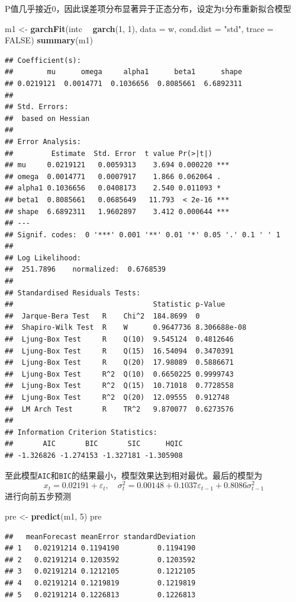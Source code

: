 \documentclass[
]{article}
\newenvironment{Shaded}{\begin{snugshade}}{\end{snugshade}}
\newcommand{\DataTypeTok}[1]{\textcolor[rgb]{0.13,0.29,0.53}{#1}}
\newcommand{\DecValTok}[1]{\textcolor[rgb]{0.00,0.00,0.81}{#1}}
\newcommand{\KeywordTok}[1]{\textcolor[rgb]{0.13,0.29,0.53}{\textbf{#1}}}
\newcommand{\NormalTok}[1]{#1}
\newcommand{\OperatorTok}[1]{\textcolor[rgb]{0.81,0.36,0.00}{\textbf{#1}}}
\newcommand{\OtherTok}[1]{\textcolor[rgb]{0.56,0.35,0.01}{#1}}
\newcommand{\StringTok}[1]{\textcolor[rgb]{0.31,0.60,0.02}{#1}}
\begin{document}
P值几乎接近0，因此误差项分布显著异于正态分布，设定为t分布重新拟合模型

\begin{Shaded}
\begin{Highlighting}[]
\NormalTok{m1 <-}\StringTok{ }\KeywordTok{garchFit}\NormalTok{(intc }\OperatorTok{~}\StringTok{ }\KeywordTok{garch}\NormalTok{(}\DecValTok{1}\NormalTok{, }\DecValTok{1}\NormalTok{), }\DataTypeTok{data =}\NormalTok{ w,}
               \DataTypeTok{cond.dist =} \StringTok{"std"}\NormalTok{, }\DataTypeTok{trace =} \OtherTok{FALSE}\NormalTok{)}
\KeywordTok{summary}\NormalTok{(m1)}
\end{Highlighting}
\end{Shaded}

\begin{verbatim}
## Coefficient(s):
##        mu      omega     alpha1      beta1      shape  
## 0.0219121  0.0014771  0.1036656  0.8085661  6.6892311  
## 
## Std. Errors:
##  based on Hessian 
## 
## Error Analysis:
##         Estimate  Std. Error  t value Pr(>|t|)    
## mu     0.0219121   0.0059313    3.694 0.000220 ***
## omega  0.0014771   0.0007917    1.866 0.062064 .  
## alpha1 0.1036656   0.0408173    2.540 0.011093 *  
## beta1  0.8085661   0.0685649   11.793  < 2e-16 ***
## shape  6.6892311   1.9602897    3.412 0.000644 ***
## ---
## Signif. codes:  0 '***' 0.001 '**' 0.01 '*' 0.05 '.' 0.1 ' ' 1
## 
## Log Likelihood:
##  251.7896    normalized:  0.6768539 
## 
## Standardised Residuals Tests:
##                                 Statistic p-Value     
##  Jarque-Bera Test   R    Chi^2  184.8699  0           
##  Shapiro-Wilk Test  R    W      0.9647736 8.306688e-08
##  Ljung-Box Test     R    Q(10)  9.545124  0.4812646   
##  Ljung-Box Test     R    Q(15)  16.54094  0.3470391   
##  Ljung-Box Test     R    Q(20)  17.98089  0.5886671   
##  Ljung-Box Test     R^2  Q(10)  0.6650225 0.9999743   
##  Ljung-Box Test     R^2  Q(15)  10.71018  0.7728558   
##  Ljung-Box Test     R^2  Q(20)  12.09555  0.912748    
##  LM Arch Test       R    TR^2   9.870077  0.6273576   
## 
## Information Criterion Statistics:
##       AIC       BIC       SIC      HQIC 
## -1.326826 -1.274153 -1.327181 -1.305908
\end{verbatim}

至此模型\texttt{AIC}和\texttt{BIC}的结果最小，模型效果达到相对最优。最后的模型为
\[
x_t = 0.02191+\varepsilon_t,\quad
\sigma^2_t = 0.00148+0.1037\varepsilon_{t-1}+0.8086\sigma_{t-1}^2
\] 进行向前五步预测

\begin{Shaded}
\begin{Highlighting}[]
\NormalTok{pre <-}\StringTok{ }\KeywordTok{predict}\NormalTok{(m1, }\DecValTok{5}\NormalTok{)}
\NormalTok{pre}
\end{Highlighting}
\end{Shaded}

\begin{verbatim}
##   meanForecast meanError standardDeviation
## 1   0.02191214 0.1194190         0.1194190
## 2   0.02191214 0.1203592         0.1203592
## 3   0.02191214 0.1212105         0.1212105
## 4   0.02191214 0.1219819         0.1219819
## 5   0.02191214 0.1226813         0.1226813
\end{verbatim}
\end{document}
